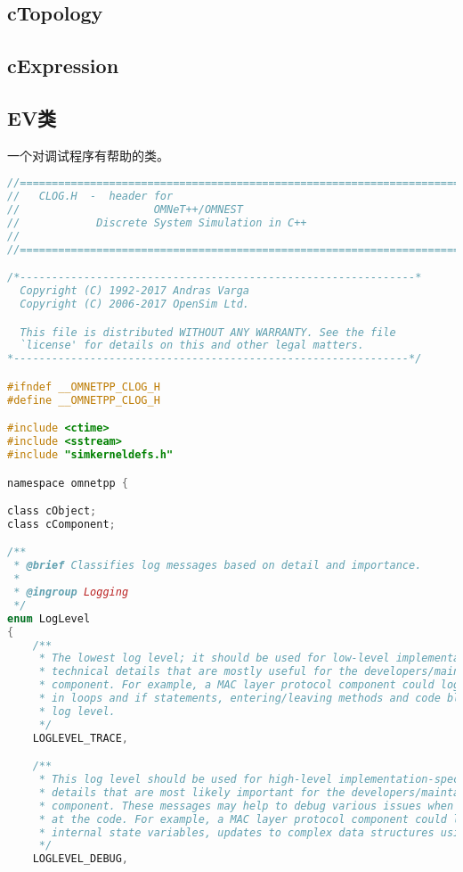 \subsection{cTopology}
\label{ctopology}

\subsection{cExpression}
\label{cexpression}

\subsection{EV类}
\label{ev类}

一个对调试程序有帮助的类。

\begin{lstlisting}[language=c]
//==========================================================================
//   CLOG.H  -  header for
//                     OMNeT++/OMNEST
//            Discrete System Simulation in C++
//
//==========================================================================

/*--------------------------------------------------------------*
  Copyright (C) 1992-2017 Andras Varga
  Copyright (C) 2006-2017 OpenSim Ltd.

  This file is distributed WITHOUT ANY WARRANTY. See the file
  `license' for details on this and other legal matters.
*--------------------------------------------------------------*/

#ifndef __OMNETPP_CLOG_H
#define __OMNETPP_CLOG_H

#include <ctime>
#include <sstream>
#include "simkerneldefs.h"

namespace omnetpp {

class cObject;
class cComponent;

/**
 * @brief Classifies log messages based on detail and importance.
 *
 * @ingroup Logging
 */
enum LogLevel
{
    /**
     * The lowest log level; it should be used for low-level implementation-specific
     * technical details that are mostly useful for the developers/maintainers of the
     * component. For example, a MAC layer protocol component could log control flow
     * in loops and if statements, entering/leaving methods and code blocks using this
     * log level.
     */
    LOGLEVEL_TRACE,

    /**
     * This log level should be used for high-level implementation-specific technical
     * details that are most likely important for the developers/maintainers of the
     * component. These messages may help to debug various issues when one is looking
     * at the code. For example, a MAC layer protocol component could log updates to
     * internal state variables, updates to complex data structures using this log level.
     */
    LOGLEVEL_DEBUG,


\end{lstlisting}
